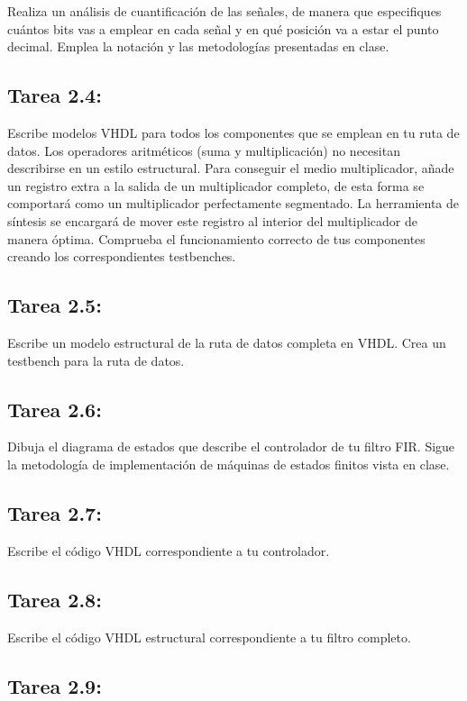 \documentclass{article}
\begin{document}
Realiza un análisis de cuantificación de las señales, de manera que especifiques cuántos bits vas a emplear en cada señal y en qué posición va a estar el punto decimal. Emplea la notación y las metodologías presentadas en clase.

\subsection{Tarea 2.4:}

Escribe modelos VHDL para todos los componentes que se emplean en tu ruta de datos. Los operadores aritméticos (suma y multiplicación) no necesitan describirse en un estilo estructural. Para conseguir el medio multiplicador, añade un registro extra a la salida de un multiplicador completo, de esta forma se comportará como un multiplicador perfectamente segmentado. La herramienta de síntesis se encargará de mover este registro al interior del multiplicador de manera óptima. Comprueba el funcionamiento correcto de tus componentes creando los correspondientes testbenches.

\subsection{Tarea 2.5:}
Escribe un modelo estructural de la ruta de datos completa en VHDL. Crea un testbench para la ruta de datos.

\subsection{Tarea 2.6:}

Dibuja el diagrama de estados que describe el controlador de tu filtro FIR. Sigue la metodología de implementación de máquinas de estados finitos vista en clase.

\subsection{Tarea 2.7:}

Escribe el código VHDL correspondiente a tu controlador.

\subsection{Tarea 2.8:}

Escribe el código VHDL estructural correspondiente a tu filtro completo.

\subsection{Tarea 2.9:}
\end{document}
